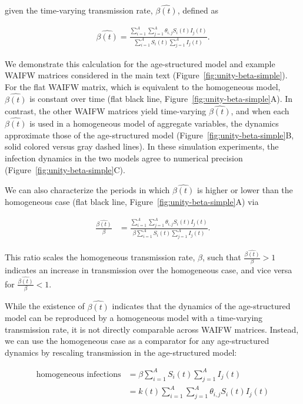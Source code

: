 \documentclass[12pt]{article}
\begin{document}
\noindent
given the time-varying transmission rate, $\hat{\beta(t)}$, defined as 

\begin{align}
\hat{\beta(t)} = \frac{\sum_{i=1}^{A}\sum_{j=1}^{A} \theta_{i,j} S_i(t) I_j(t)}{\sum_{i=1}^{A}S_i(t)\sum_{j=1}^{A}I_j(t)}.
\label{eq:unity-beta-simple}
\end{align} 

We demonstrate this calculation for the age-structured model and example WAIFW matrices considered in the main text (Figure~\ref{fig:unity-beta-simple}). For the flat WAIFW matrix, which is equivalent to the homogeneous model, $\hat{\beta(t)}$ is constant over time (flat black line, Figure~\ref{fig:unity-beta-simple}A). In contrast, the other WAIFW matrices yield time-varying $\hat{\beta(t)}$, and when each $\hat{\beta(t)}$ is used in a homogeneous model of aggregate variables, the dynamics approximate those of the age-structured model (Figure~\ref{fig:unity-beta-simple}B, solid colored versus gray dashed lines). In these simulation experiments, the infection dynamics in the two models agree to numerical precision (Figure~\ref{fig:unity-beta-simple}C).

We can also characterize the periods in which $\hat{\beta(t)}$ is higher or lower than the homogeneous case (flat black line, Figure~\ref{fig:unity-beta-simple}A) via 

\begin{align}
    \frac{\hat{\beta(t)}}{\beta} &= \frac{\sum_{i=1}^{A}\sum_{j=1}^{A} \theta_{i,j} S_i(t) I_j(t)}{\beta \sum_{i=1}^{A}S_i(t)\sum_{j=1}^{A}I_j(t)}.
    \label{eq:equiv-ratio-simple}
\end{align}

\noindent
This ratio scales the homogeneous transmission rate, $\beta$, such that $\frac{\hat{\beta(t)}}{\beta} > 1$ indicates an increase in transmission over the homogeneous case, and vice versa for $\frac{\hat{\beta(t)}}{\beta} < 1$.

While the existence of $\hat{\beta(t)}$ indicates that the dynamics of the age-structured model can be reproduced by a homogeneous model with a time-varying transmission rate, it is not directly comparable across WAIFW matrices. Instead, we can use the homogeneous case as a comparator for any age-structured dynamics by rescaling transmission in the age-structured model: 

\begin{equation}
\begin{aligned}
    \text{homogeneous infections} &= \beta \sum_{i=1}^{A} S_i(t) \sum_{j=1}^{A} I_j(t) \\
    &= k(t) \sum_{i=1}^{A}\sum_{j=1}^{A} \theta_{i,j} S_i(t) I_j(t) %
\end{aligned}
\label{eq:derive-unity-beta-homogeneous}
\end{equation}
\end{document}
